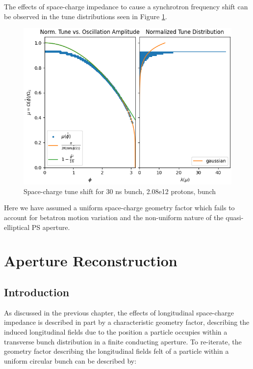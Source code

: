 The effects of space-charge impedance to cause a synchrotron frequency shift can be observed in the tune distributions seen in Figure \ref{fig:tune_shift}.

\begin{figure}
    \centering
    \includegraphics{figs/tune_shift/normalized_tune.png}
    \caption{Space-charge tune shift for 30 ns bunch, 2.08e12 protons, bunch}
    \label{fig:tune_shift}
\end{figure}

Here we have assumed a uniform space-charge geometry factor which fails to account for betatron motion variation and the non-uniform nature of the quasi-elliptical PS aperture.

\chapter{Aperture Reconstruction}

\section{Introduction}

As discussed in the previous chapter, the effects of longitudinal space-charge impedance is described in part by a characteristic geometry factor, describing the induced longitudinal fields due to the position a particle occupies within a transverse bunch distribution in a finite conducting aperture. To re-iterate, the geometry factor describing the longitudinal fields felt of a particle within a uniform circular bunch can be described by:

